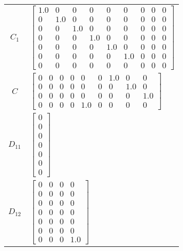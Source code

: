 \begin{tabular}{cl}
 $C_{1}$  & $\left[\begin{matrix}1.0 & 0 & 0 & 0 & 0 & 0 & 0 & 0 & 0\\0 & 1.0 & 0 & 0 & 0 & 0 & 0 & 0 & 0\\0 & 0 & 1.0 & 0 & 0 & 0 & 0 & 0 & 0\\0 & 0 & 0 & 1.0 & 0 & 0 & 0 & 0 & 0\\0 & 0 & 0 & 0 & 1.0 & 0 & 0 & 0 & 0\\0 & 0 & 0 & 0 & 0 & 1.0 & 0 & 0 & 0\\0 & 0 & 0 & 0 & 0 & 0 & 0 & 0 & 0\end{matrix}\right]$                                                                                  \\
   $C$    & $\left[\begin{matrix}0 & 0 & 0 & 0 & 0 & 0 & 1.0 & 0 & 0\\0 & 0 & 0 & 0 & 0 & 0 & 0 & 1.0 & 0\\0 & 0 & 0 & 0 & 0 & 0 & 0 & 0 & 1.0\\0 & 0 & 0 & 0 & 1.0 & 0 & 0 & 0 & 0\end{matrix}\right]$                                                                                                                                                                                               \\
 $D_{11}$ & $\left[\begin{matrix}0\\0\\0\\0\\0\\0\\0\end{matrix}\right]$                                                                                                                                                                                                                                                                                                                              \\
 $D_{12}$ & $\left[\begin{matrix}0 & 0 & 0 & 0\\0 & 0 & 0 & 0\\0 & 0 & 0 & 0\\0 & 0 & 0 & 0\\0 & 0 & 0 & 0\\0 & 0 & 0 & 0\\0 & 0 & 0 & 1.0\end{matrix}\right]$                                                                                                                                                                                                                                        \\

\end{tabular}

